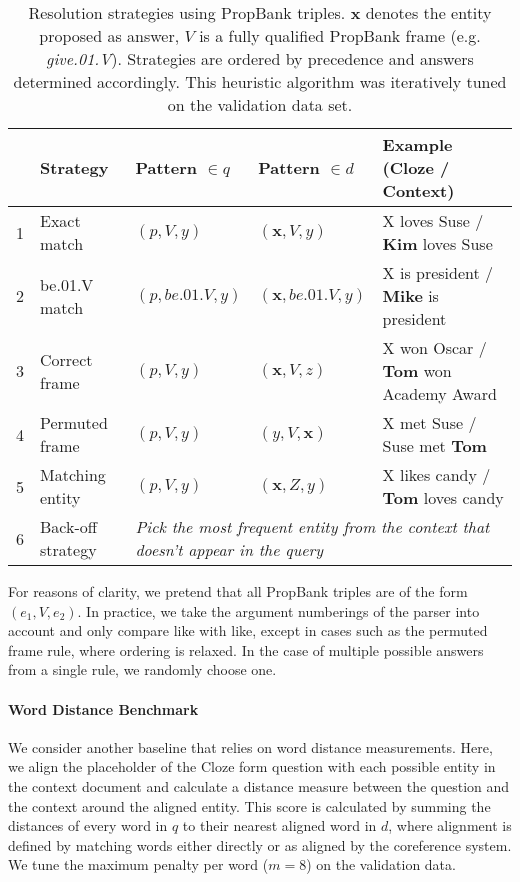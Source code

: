 \documentclass{article}
\begin{document}
\begin{table}[h]\footnotesize
  \centering
  \begin{tabular}{@{}rllll@{}}
    \toprule
    & Strategy & Pattern $\in q$ & Pattern $\in d$ & Example (Cloze / Context) \\
    \midrule
    1 & Exact match & $(p,V,y)$ & $(\bm{x},V,y)$ & X loves Suse / \textbf{Kim} loves Suse \\
    2 & be.01.V match & $(p,\textit{be.01.V},y)$ & $(\bm{x},\textit{be.01.V},y)$ & X is president / \textbf{Mike} is president \\
    3 & Correct frame & $(p,V,y)$ & $(\bm{x},V,z)$ & X won Oscar / \textbf{Tom} won Academy Award \\
    4 & Permuted frame & $(p,V,y)$ & $(y,V,\bm{x})$ & X met Suse / Suse met \textbf{Tom} \\
    5 & Matching entity & $(p,V,y)$ & $(\bm{x},Z,y)$ & X likes candy / \textbf{Tom} loves candy \\
    6 & Back-off strategy & \multicolumn{3}{l}{\textit{Pick the most frequent entity from the context that doesn't appear in the query}} \\
    \bottomrule
  \end{tabular}
  \caption{Resolution strategies using PropBank triples. $\bm{x}$ denotes the
    entity proposed as answer, $V$ is a fully qualified PropBank frame (e.g.
    \textit{give.01.V}). Strategies are ordered by precedence and answers
    determined accordingly. This heuristic algorithm was iteratively
    tuned on the validation data set.
    \label{tab:fsp}
  }
\end{table}

For reasons of clarity, we pretend that all PropBank triples are of the form
$(e_1,V,e_2)$. In practice, we take the argument numberings of the parser into
account and only compare like with like, except in cases such as the permuted
frame rule, where ordering is relaxed. In the case of multiple possible answers
from a single rule, we randomly choose one.

\paragraph{Word Distance Benchmark}

We consider another baseline that relies on word distance measurements. Here, we
align the placeholder of the Cloze form question with each possible entity in
the context document and calculate a distance measure between the question and the
context around the aligned entity.
This score is calculated by summing the distances of every word in $q$
to their nearest aligned word in $d$, where alignment is defined by matching
words either directly or as aligned by the coreference system. We tune the
maximum penalty per word ($m=8$) on the validation data.
\end{document}
